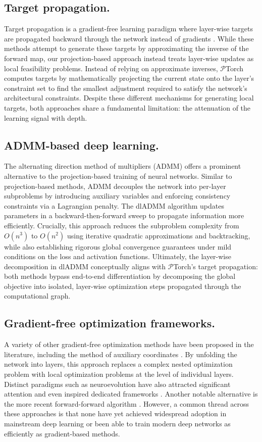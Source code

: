 \subsection{Target propagation.}
Target propagation is a  gradient-free learning paradigm where layer-wise targets are propagated backward through the network instead of gradients \cite{lee2015difference}. While these methods attempt to generate these targets by approximating the inverse of the forward map, our projection-based approach instead treats layer-wise updates as local feasibility problems. Instead of relying on approximate inverses, $\mathcal{P}$Torch computes targets by mathematically projecting the current state onto the layer's constraint set to find the smallest adjustment required to satisfy the network's architectural constraints. Despite these different mechanisms for generating local targets, both approaches share a fundamental limitation: the attenuation of the learning signal with depth.  

\subsection{ADMM-based deep learning.}
The alternating direction method of multipliers (ADMM) \cite{neal2011distributed} offers a prominent alternative to the projection-based training of neural networks. Similar to projection-based methods, ADMM decouples the network into per-layer subproblems by introducing auxiliary variables and enforcing consistency constraints via a Lagrangian penalty. The dlADMM \cite{10.1145/3292500.3330936} algorithm updates parameters in a backward-then-forward sweep to propagate information more efficiently. Crucially, this approach reduces the subproblem complexity from $O(n^3)$ to $O(n^2)$ using iterative quadratic approximations and backtracking, while also establishing rigorous global convergence guarantees under mild conditions on the loss and activation functions. Ultimately, the layer-wise decomposition in dlADMM conceptually aligns with $\mathcal{P}$Torch's target propagation: both methods bypass end-to-end differentiation by decomposing the global objective into isolated, layer-wise optimization steps propagated through the computational graph.

\subsection{Gradient-free optimization frameworks.}
A variety of other gradient-free optimization methods have been proposed in the literature, including the method of auxiliary coordinates \cite{carreira2014distributed}. By unfolding the network into layers, this approach replaces a complex nested optimization problem with local optimization problems at the level of individual layers. Distinct paradigms such as neuroevolution have also attracted significant attention and even inspired dedicated frameworks \cite{tang2022evojax}. Another notable alternative is the more recent forward-forward algorithm \cite{hinton2022forward}. However, a common thread across these approaches is that none have yet achieved widespread adoption in mainstream deep learning or been able to train modern deep networks as efficiently as gradient-based methods.
